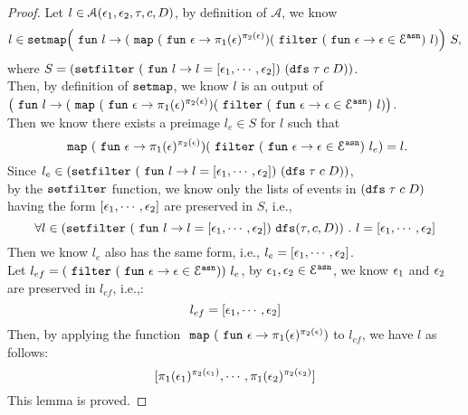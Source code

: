 %
\begin{proof}
Let  $l \in \mathcal{A}(\mathtt{\epsilon}_1, \mathtt{\epsilon}_2, \mathtt{\tau}, c, D)$,
by definition of $\mathcal{A}$, we know 
%
$$l\in \kw{setmap} 
		\left(\efun l \to ( \emap 
		(\efun  \event \to \pi_1(\event)^{\pi_2(\event)})
	(\efilter 
		(\efun \event \to  \event \in \eventset^{\asn}) ~ l) \right)
	~ S,
$$
%
where $S=(\mathtt{setfilter} ~(~\mathtt{fun}~ l \to l = [\mathtt{\epsilon}_1, \cdots, \mathtt{\epsilon}_2]) ~ (\mathtt{dfs} \; \mathtt{\tau} \; c \;  D))$.
\\
Then, by definition of $\mathtt{setmap}$, we know $l$ is an output of
\\
$\left(\efun l \to ( \emap 
		(\efun  \event \to \pi_1(\event)^{\pi_2(\event)})
	(\efilter 
		(\efun \event \to  \event \in \eventset^{\asn}) ~ l) \right)$.
\\
Then we know there exists a preimage
$l_e \in S $
for $l$ such that 
$$
~\mathtt{map}~ (~\mathtt{fun}~  \mathtt{\epsilon} \to \pi_1(\mathtt{\epsilon})^{\pi_2(\mathtt{\epsilon})}) 
(~\mathtt{filter}~ (~\mathtt{fun}~ \mathtt{\epsilon} \to  \mathtt{\epsilon} \in \mathcal{E}^{\mathtt{{asn}}}) ~ l_e) 
= l.
$$
Since $l_e \in (\mathtt{setfilter} ~(~\mathtt{fun}~ l \to l = [\mathtt{\epsilon}_1, \cdots, \mathtt{\epsilon}_2]) ~ (\mathtt{dfs} \; \mathtt{\tau} \; c \;  D))$,
\\
by the $\mathtt{setfilter}$ function,
we know only the lists of events in $(\mathtt{dfs} \; \mathtt{\tau} \; c \;  D)$ having the form
$ [\mathtt{\epsilon}_1, \cdots, \mathtt{\epsilon}_2] $ are preserved in $S$, i.e.,
\[
	\forall l \in (\mathtt{setfilter} ~(~\mathtt{fun}~ l \to l = [\mathtt{\epsilon}_1, \cdots, \mathtt{\epsilon}_2]) ~ \mathtt{dfs}(\mathtt{\tau}, c, D))
	~.~ l = [\mathtt{\epsilon}_1, \cdots, \mathtt{\epsilon}_2]
\]
%
Then we know $l_e$ also has the same form, 
i.e., $l_e = [\mathtt{\epsilon}_1, \cdots, \mathtt{\epsilon}_2]$.
%
\\
Let $l_{ef} = (~\mathtt{filter}~ (~\mathtt{fun}~ \mathtt{\epsilon} \to  \mathtt{\epsilon} \in \mathcal{E}^{\mathtt{{asn}}})) ~ l_e$, 
by $\mathtt{\epsilon}_1, \mathtt{\epsilon}_2 \in \mathcal{E}^{\mathtt{{asn}}}$, 
we know $\mathtt{\epsilon}_1$ and $\mathtt{\epsilon}_2$ are preserved in $l_{ef}$, i.e.,:
\[
	l_{ef} =[\mathtt{\epsilon}_1, \cdots, \mathtt{\epsilon}_2]
\]
%
Then, by applying the function
$~\mathtt{map}~ (~\mathtt{fun}~  \mathtt{\epsilon} \to \pi_1(\mathtt{\epsilon})^{\pi_2(\mathtt{\epsilon})})$ to 
$l_{ef}$, we have $l$ as follows:
\[
	[\pi_1(\mathtt{\epsilon}_1)^{\pi_2(\mathtt{\epsilon}_1)}, \cdots, \pi_1(\mathtt{\epsilon}_2)^{\pi_2(\mathtt{\epsilon}_2)}]
\]
%
%
This lemma is proved.
\end{proof}
